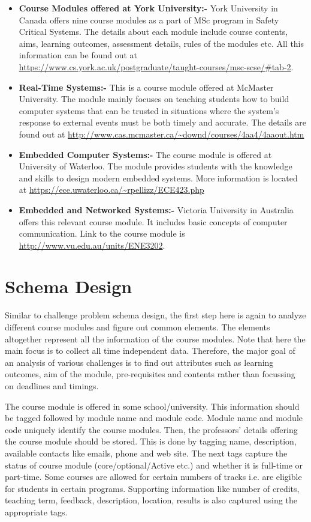\documentclass[11pt,letterpaper]{report}
\begin{document}
\begin{itemize}
\item \textbf{Course Modules offered at York University:- } York University in Canada offers nine course modules as a part of MSc program in Safety Critical Systems. The details about each module include course contents, aims, learning outcomes, assessment details, rules of the modules etc. All this information can be found out at \url{https://www.cs.york.ac.uk/postgraduate/taught-courses/msc-scse/#tab-2}. \cite{York}   
\item \textbf{Real-Time Systems:- } This is a course module offered at McMaster University. The module mainly focuses on teaching students how to build computer systems that can be trusted in situations where the system's response to external events must be both timely and accurate. The details are found out at \url{http://www.cas.mcmaster.ca/~downd/courses/4aa4/4aaout.htm} \cite{MaC}
\item \textbf{Embedded Computer Systems:- } The course module is offered at University of Waterloo. The module provides students with the knowledge and skills to design modern embedded systems. More information is located at 
\url{https://ece.uwaterloo.ca/~rpellizz/ECE423.php} \cite{Waterloo}
\item \textbf{Embedded and Networked Systems:- } Victoria University in Australia offers this relevant course module.
It includes basic concepts of computer communication. Link to the course module is \url{http://www.vu.edu.au/units/ENE3202}.
\end{itemize}

\section{Schema Design}
Similar to challenge problem schema design, the first step here is again to analyze different course modules and figure out common elements. The elements altogether represent all the information of the course modules. Note that here the main focus is to collect all time independent data. Therefore, the major goal of an analysis of various challenges is to find out attributes such as learning outcomes, aim of the module, pre-requisites and contents rather than focussing on deadlines and timings.  

The course module is offered in some school/university. This information should be tagged followed by module name and module code. Module name and module code uniquely identify the course modules. Then, the professors' details offering the course module should be stored. This is done by tagging name, description, available contacts like emails, phone and web site. The next tags capture the status of course module (core/optional/Active etc.) and whether it is full-time or part-time. Some courses are allowed for certain numbers of tracks i.e. are eligible for students in certain programs. Supporting information like number of credits, teaching term, feedback, description, location, results is also captured using the appropriate tags. 
\end{document}

